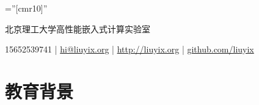 \documentclass[a4paper,10pt]{article} %
\begin{document}
\pagestyle{empty} %

\font\fb=''[cmr10]'' %


\par{\bigskip\par} %

\centerline{北京理工大学高性能嵌入式计算实验室}
\centerline {15652539741 | \href {mailto:hi@liuyix.org}{hi@liuyix.org} | \href {http://liuyix.org}{http://liuyix.org} | \href {https://github.com/liuyix}{github.com/liuyix} }




\section{教育背景}
\end{document}
